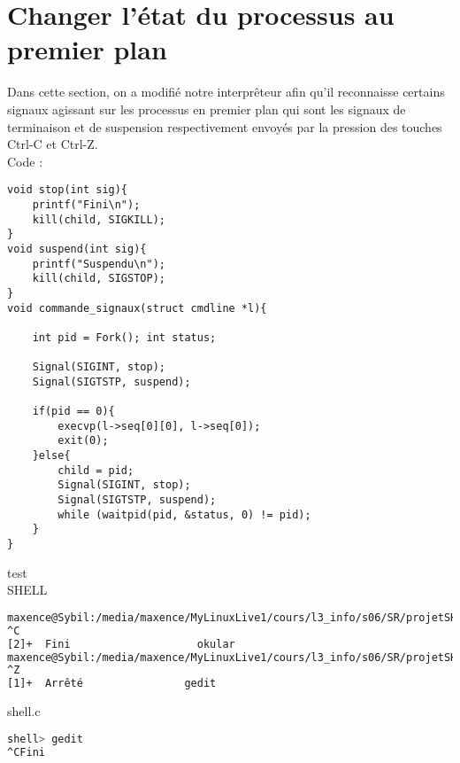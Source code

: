 \documentclass{report}
\begin{document}
		\section{Changer l'\'etat du processus au premier plan}
	Dans cette section, on a modifi\'e notre interpr\^eteur afin qu'il reconnaisse certains signaux agissant sur les processus en premier plan qui sont les signaux de terminaison et de suspension respectivement envoy\'es par la pression des touches Ctrl-C et Ctrl-Z.\\Code :
			\begin{lstlisting}
void stop(int sig){
	printf("Fini\n");
	kill(child, SIGKILL);
}
void suspend(int sig){
	printf("Suspendu\n");
	kill(child, SIGSTOP);
}
void commande_signaux(struct cmdline *l){

	int pid = Fork(); int status;

	Signal(SIGINT, stop);	
	Signal(SIGTSTP, suspend);

	if(pid == 0){
		execvp(l->seq[0][0], l->seq[0]);
		exit(0);
	}else{
		child = pid;
		Signal(SIGINT, stop);
		Signal(SIGTSTP, suspend);
		while (waitpid(pid, &status, 0) != pid);
	}
}
			\end{lstlisting}
			test \\ SHELL 
			\begin{lstlisting}[frame=single,basicstyle=\footnotesize,language=bash]
maxence@Sybil:/media/maxence/MyLinuxLive1/cours/l3_info/s06/SR/projetSHELL$ gedit 
^C
[2]+  Fini                    okular
maxence@Sybil:/media/maxence/MyLinuxLive1/cours/l3_info/s06/SR/projetSHELL$ gedit 
^Z
[1]+  Arrêté                gedit

			\end{lstlisting}
			shell.c 
			\begin{lstlisting}[frame=single,basicstyle=\footnotesize,language=bash]
shell> gedit
^CFini

			\end{lstlisting}
\end{document}
